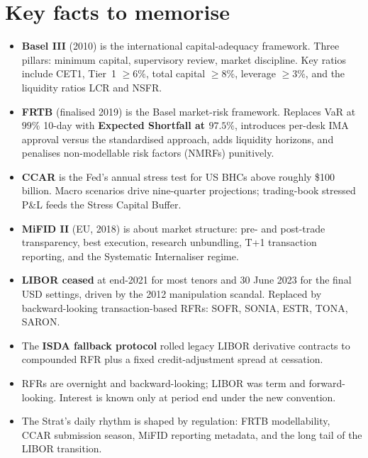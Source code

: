 \section{Key facts to memorise}
\label{sec:ch37_key}

\begin{keyfactbox}
\begin{itemize}
  \item \textbf{Basel III} (2010) is the international
    capital-adequacy framework.  Three pillars: minimum
    capital, supervisory review, market discipline.  Key
    ratios include CET1, Tier~1 $\geq 6\%$, total capital
    $\geq 8\%$, leverage $\geq 3\%$, and the liquidity ratios
    LCR and NSFR.
  \item \textbf{FRTB} (finalised 2019) is the Basel
    market-risk framework.  Replaces VaR at $99\%$ 10-day
    with \textbf{Expected Shortfall at $97.5\%$}, introduces
    per-desk IMA approval versus the standardised approach,
    adds liquidity horizons, and penalises non-modellable
    risk factors (NMRFs) punitively.
  \item \textbf{CCAR} is the Fed's annual stress test for US
    BHCs above roughly \$100 billion.  Macro scenarios drive
    nine-quarter projections; trading-book stressed P\&L
    feeds the Stress Capital Buffer.
  \item \textbf{MiFID II} (EU, 2018) is about market
    structure: pre- and post-trade transparency, best
    execution, research unbundling, T+1 transaction
    reporting, and the Systematic Internaliser regime.
  \item \textbf{LIBOR ceased} at end-2021 for most tenors and
    30 June 2023 for the final USD settings, driven by the
    2012 manipulation scandal.  Replaced by backward-looking
    transaction-based RFRs: SOFR, SONIA, ESTR,
    TONA, SARON.
  \item The \textbf{ISDA fallback protocol} rolled legacy
    LIBOR derivative contracts to compounded RFR plus a
    fixed credit-adjustment spread at cessation.
  \item RFRs are overnight and backward-looking; LIBOR was
    term and forward-looking.  Interest is known only at
    period end under the new convention.
  \item The Strat's daily rhythm is shaped by regulation:
    FRTB modellability, CCAR submission season, MiFID
    reporting metadata, and the long tail of the LIBOR
    transition.
\end{itemize}
\end{keyfactbox}
